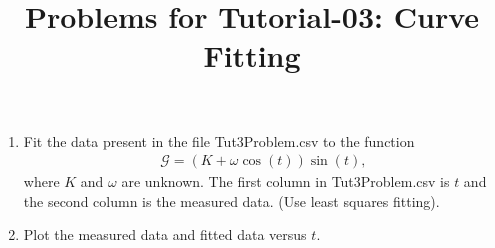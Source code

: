 \documentclass[10pt,a4paper]{article}
\begin{document}
\title{Problems for Tutorial-03: Curve Fitting}
\date{}
\maketitle
\begin{enumerate}
\item Fit the data present in the file Tut3Problem.csv to the function
\begin{align*}
	\mathcal{G} = \left(K + \omega \cos(t)\right)\sin(t), 
\end{align*}
where $K$ and $\omega$ are unknown. The first column 
in Tut3Problem.csv is $t$ and the second column is the measured data. (Use least 
squares fitting).
\item Plot the measured data and fitted data versus $t$.
\end{enumerate}
\end{document}
